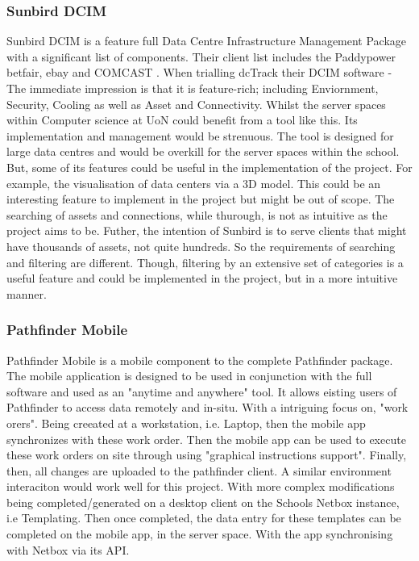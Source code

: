 \documentclass [12pt,letterpaper]{article}
\begin{document}
\subsubsection{Sunbird DCIM}
\label{sec:sunbird}
Sunbird DCIM is a feature full Data Centre Infrastructure Management Package with a significant list of components. Their client list includes the Paddypower betfair, ebay and COMCAST \cite{Sunbird-we-know-data-centres}. When trialling dcTrack their DCIM software - The immediate impression is that it is feature-rich; including Enviornment, Security, Cooling as well as Asset and Connectivity. Whilst the server spaces within Computer science at UoN could benefit from a tool like this. 
Its implementation and management would be strenuous. The tool is designed for large data centres and would be overkill for the server spaces within the school. But, some of its features could be useful in the implementation of the project. For example, the visualisation of data centers via a 3D model. This could be an interesting feature to implement in the project but might be out of scope. The searching of assets and connections, while thurough, is not as intuitive as the project aims to be. Futher, the intention of Sunbird is to serve clients that might have thousands of assets, not quite hundreds. So the requirements of searching and filtering are different. Though, filtering by an extensive set of categories is a useful feature and could be implemented in the project, but in a more intuitive manner. 

\subsubsection{Pathfinder Mobile}
\label{sec:pathfinder}
Pathfinder Mobile is a mobile component to the complete Pathfinder package. The mobile application is designed to be used in conjunction with the full software and used as an "anytime and anywhere" tool. It allows eisting users of Pathfinder to access data remotely and in-situ. With a intriguing focus on, "work orers". Being creeated at a workstation, i.e. Laptop, then the mobile app synchronizes with these work order. Then the mobile app can be used to execute these work orders on site through using "graphical instructions support"\cite{Pathfinder}. Finally, then, all changes are uploaded to the pathfinder client. A similar environment interaciton would work well for this project. With more complex modifications being completed/generated on a desktop client on the Schools Netbox instance, i.e Templating. Then once completed, the data entry for these templates can be completed on the mobile app, in the server space. With the app synchronising with Netbox via its API. 
\end{document}
